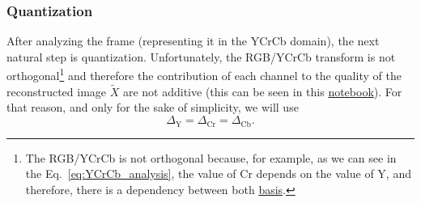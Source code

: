 \subsubsection{Quantization}
After analyzing the frame (representing it in the YCrCb domain), the
next natural step is quantization. Unfortunately, the RGB/YCrCb
transform is not orthogonal\footnote{The RGB/YCrCb is not orthogonal
because, for example, as we can see in the
Eq.~\ref{eq:YCrCb_analysis}, the value of Cr depends on the value of
Y, and therefore, there is a dependency between both
\href{https://en.wikipedia.org/wiki/Basis_(linear_algebra)}{basis}.}
and therefore the contribution of each channel to the quality of the
reconstructed image $\tilde{X}$ are not additive (this can be seen in
this
\href{https://github.com/Sistemas-Multimedia/Sistemas-Multimedia.github.io/blob/master/study_guide/06-color_transform/performance.ipynb}{notebook}). For
that reason, and only for the sake of simplicity, we will use
\begin{equation}
  \Delta_{\text{Y}} = \Delta_{\text{Cr}} = \Delta_{\text{Cb}}.
  \label{eq:simple_Q}
\end{equation}

